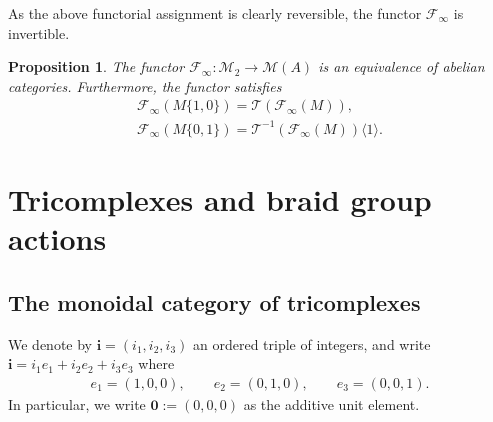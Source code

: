 \documentclass[pdftex]{sigma}
\newtheorem{prop}[thm]{Proposition}
\theoremstyle{definition}
\numberwithin{equation}{section}
\def\lra{{\longrightarrow}}
\def\mc{\mathcal}
\begin{document}
As the above functorial assignment is clearly reversible, the functor $\mc{F}_\infty$ is invertible.

\begin{prop}\label{prop-abelian-equivalence}
The functor $\mc{F}_\infty\colon \mc{M}_2\lra \mc{M}(A)$ is an equivalence of abelian categories. Furthermore, the functor satisfies
 \begin{gather*}\mc{F}_\infty (M\{1,0\})= \mc{T}(\mc{F}_\infty(M)), \\
 \mc{F}_\infty(M\{0,1\})=\mc{T}^{-1}(\mc{F}_{\infty}(M))\langle 1 \rangle
 .\end{gather*}
\end{prop}

\section{Tricomplexes and braid group actions} \label{sectricomplex}
\subsection{The monoidal category of tricomplexes}
We denote by $\mathbf{i} = (i_1,i_2,i_3)$ an ordered triple of integers, and write
$\mathbf{i}=i_1 e_1 + i_2 e_2 + i_3 e_3$ where
\begin{gather*} e_1=(1,0,0), \qquad e_2=(0,1,0),\qquad e_3=(0,0,1).\end{gather*}
In particular, we write $\mathbf{0}:=(0,0,0)$ as the additive unit element.
\end{document}
